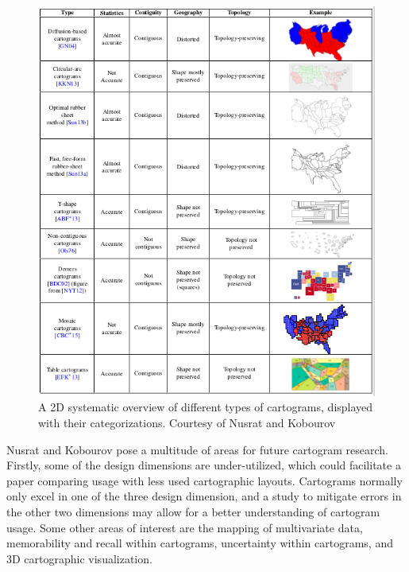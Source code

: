 \begin{figure}[p]
\begin{center}
\includegraphics[width=1\textwidth]{images/nusrat2016state.png}
\caption{A 2D systematic overview of different types of cartograms, displayed with their categorizations. Courtesy of Nusrat and Kobourov \cite{nusrat2016state}} \label{fig: nusrat2016state}
\end{center}
\end{figure}


Nusrat and Kobourov pose a multitude of areas for future cartogram research. Firstly, some of the design dimensions are under-utilized, which could facilitate a paper comparing usage with less used cartographic layouts. Cartograms normally only excel in one of the three design dimension, and a study to mitigate errors in the other two dimensions may allow for a better understanding of cartogram usage. Some other areas of interest are the mapping of multivariate data, memorability and recall within cartograms, uncertainty within cartograms, and 3D cartographic visualization.

